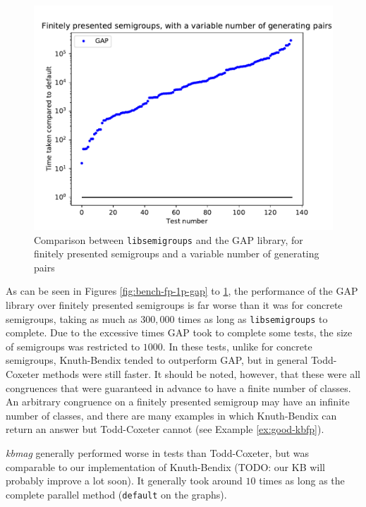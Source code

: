 \begin{figure}[h]
  \centering
  \includegraphics[width=\textwidth]{pics/ch-pairs/bench-fp-vp-gap}
  \caption{Comparison between \texttt{libsemigroups} and the GAP library, for
    finitely presented semigroups and a variable number of generating pairs}
  \label{fig:bench-fp-vp-gap}
\end{figure}

As can be seen in Figures \ref{fig:bench-fp-1p-gap} to \ref{fig:bench-fp-vp-gap}, the
performance of the GAP library over finitely presented semigroups is far worse
than it was for concrete semigroups, taking as much as $300,000$ times as long
as \texttt{libsemigroups} to complete.  Due to the excessive times GAP took to
complete some tests, the size of semigroups was restricted to $1000$.  In these
tests, unlike for concrete semigroups,
Knuth-Bendix tended to outperform GAP, but in
general Todd-Coxeter methods were still faster.  It should be noted, however,
that these were all congruences that were guaranteed in advance to have a finite
number of classes.  An arbitrary congruence on a finitely presented semigroup
may have an infinite number of classes, and there are many examples in which
Knuth-Bendix can return an answer but Todd-Coxeter cannot (see Example
\ref{ex:good-kbfp}).

\textit{kbmag} generally performed worse in tests than Todd-Coxeter, but was
comparable to our implementation of Knuth-Bendix (TODO: our KB will probably
improve a lot soon).  It generally took around $10$ times as long as the
complete parallel method (\texttt{default} on the graphs).

